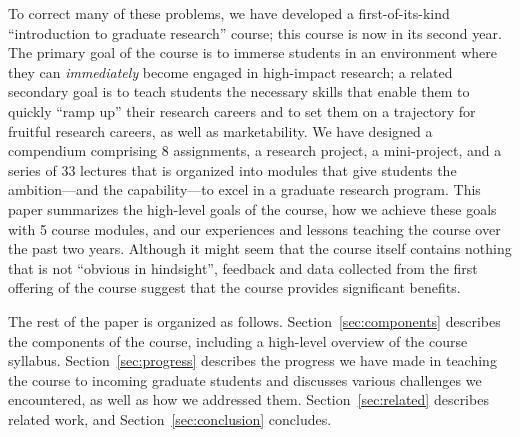 To correct many of these problems, we have developed a first-of-its-kind
``introduction to graduate research'' course; this course is now in its
second year.  The primary goal of the course is to immerse students in
an environment where they can {\em immediately} become engaged in
high-impact research; a related secondary goal is to teach students the
necessary skills that enable them to quickly ``ramp up'' their research
careers and to set them on a trajectory for fruitful research careers,
as well as marketability.  We have designed a compendium comprising 8
assignments, a research project, a mini-project, and a series of 33
lectures that is organized into modules that give students the
ambition---and the capability---to excel in a graduate research program.
This paper summarizes the high-level goals of the course, how we achieve
these goals with 5 course modules, and our experiences and lessons
teaching the course over the past two years.  Although it might seem
that the course itself contains nothing that is not ``obvious in
hindsight'', feedback and data collected from the first offering of the
course suggest that the course provides significant benefits.



The rest of the paper is organized as follows.
Section~\ref{sec:components} describes the components of the course,
including a high-level overview of the course syllabus.
Section~\ref{sec:progress} describes the progress we have made in
teaching the course to incoming graduate students and discusses various
challenges we encountered, as well as how we addressed them.
Section~\ref{sec:related} describes related work, and
Section~\ref{sec:conclusion} concludes.
